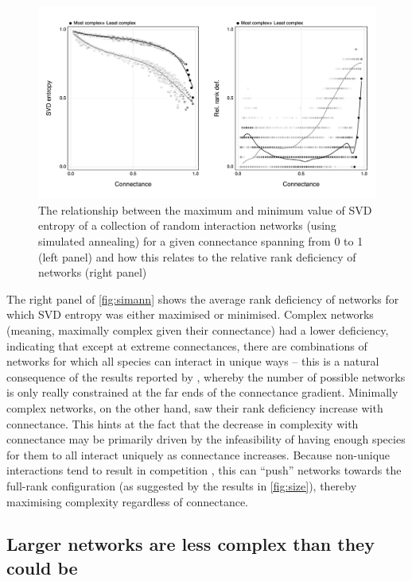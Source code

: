 \begin{figure}[h]
    \centering
    \includegraphics[width=\textwidth]{figures/minmax_combined.png}
    \caption{The relationship between the maximum and minimum value of SVD
entropy of a collection of random interaction networks (using simulated
annealing) for a given connectance spanning from 0 to 1 (left panel) and how
this relates to the relative rank deficiency of networks (right panel)}
    \label{fig:simann}
\end{figure}

The right panel of \autoref{fig:simann} shows the average rank deficiency of
networks for which SVD entropy was either maximised or minimised. Complex
networks (meaning, maximally complex given their connectance) had a lower
deficiency, indicating that except at extreme connectances, there are
combinations of networks for which all species can interact in unique ways --
this is a natural consequence of the results reported by
\cite{Poisot2014WheEco}, whereby the number of possible networks is only
really constrained at the far ends of the connectance gradient. Minimally
complex networks, on the other hand, saw their rank deficiency increase with
connectance. This hints at the fact that the decrease in complexity with
connectance may be primarily driven by the infeasibility of having enough
species for them to all interact uniquely as connectance increases. Because
non-unique interactions tend to result in competition
\cite{Bascompte2007PlaMut}, this can ``push'' networks towards the full-rank
configuration (as suggested by the results in \autoref{fig:size}), thereby
maximising complexity regardless of connectance.

\subsection{Larger networks are less complex than they could
be}\label{larger-networks-are-less-complex-than-they-could-be}

